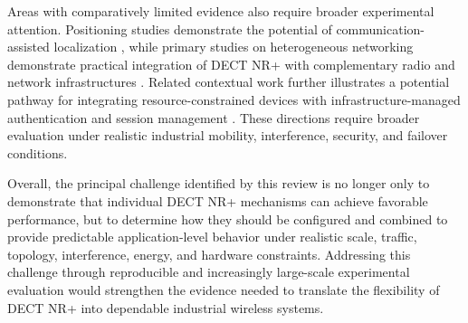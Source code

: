 Areas with comparatively limited evidence also require broader experimental attention. Positioning studies demonstrate the potential of communication-assisted localization \cite{saikkoPositioningDECT2020NR2024, saikkoPositioningTrackingDECT20202025}, while primary studies on heterogeneous networking demonstrate practical integration of DECT NR+ with complementary radio and network infrastructures \cite{dangEWDCIntegratingDECT20202025a, dangUniRATUnifiedDECT20202026}. Related contextual work further illustrates a potential pathway for integrating resource-constrained devices with infrastructure-managed authentication and session management \cite{ngoIoTDeviceAuthentication2025}. These directions require broader evaluation under realistic industrial mobility, interference, security, and failover conditions.

Overall, the principal challenge identified by this review is no longer only to demonstrate that individual DECT NR+ mechanisms can achieve favorable performance, but to determine how they should be configured and combined to provide predictable application-level behavior under realistic scale, traffic, topology, interference, energy, and hardware constraints. Addressing this challenge through reproducible and increasingly large-scale experimental evaluation would strengthen the evidence needed to translate the flexibility of DECT NR+ into dependable industrial wireless systems.